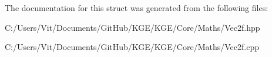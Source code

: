 The documentation for this struct was generated from the following files\-:\begin{DoxyCompactItemize}
\item 
C\-:/\-Users/\-Vit/\-Documents/\-Git\-Hub/\-K\-G\-E/\-K\-G\-E/\-Core/\-Maths/Vec2f.\-hpp\item 
C\-:/\-Users/\-Vit/\-Documents/\-Git\-Hub/\-K\-G\-E/\-K\-G\-E/\-Core/\-Maths/Vec2f.\-cpp\end{DoxyCompactItemize}

